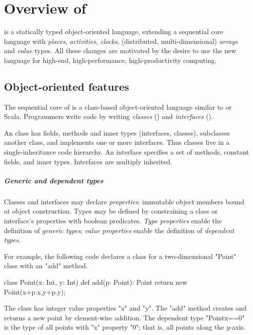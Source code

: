 \chapter{Overview of \Xten}

\Xten{} is a statically typed object-oriented language, extending a
sequential core language with 
\emph{places},
\emph{activities}, \emph{clocks},
(distributed, multi-dimensional) \emph{arrays} and \emph{value}
types. All these changes are motivated by the desire to use the new
language for high-end, high-performance, high-productivity computing.

\section{Object-oriented features}

The sequential core of \Xten{} is a class-based object-oriented language
similar to \java{} or Scala.
Programmers write \Xten{} code by writing
\emph{classes}
() and
\emph{interfaces}
().

An \Xten{} class has fields, methods and
inner types (interfaces, classes), subclasses another class, and
implements one or more interfaces. Thus \Xten{} classes live in a
single-inheritance code hierarchy.  An interface specifies a set
of methods, constant fields, and inner types.  Interfaces are
multiply inherited.

\paragraph{Generic and dependent types}
Classes and interfaces may declare \emph{properties}: immutable object members bound at object construction.
Types may be defined by constraining a
class or interface's properties with boolean predicates.
\emph{Type properties} enable the definition of \emph{generic types};
\emph{value properties} enable the definition of \emph{dependent types}.

For example, the following code declares a class for a two-dimensional 
\xcd"Point" class with an \xcd"add" method.
\begin{xten}
class Point(x: Int, y: Int) {
    def add(p: Point): Point { return new Point(x+p.x,y+p.y); }
}
\end{xten}
The class has integer value properties \xcd"x" and \xcd"y".
The \xcd"add" method creates and returns a new point by
element-wise addition.
The dependent type \xcd"Point{x==0}" is the type of all points 
with \xcd"x" property \xcd"0"; that is, all points along the $y$-axis.

